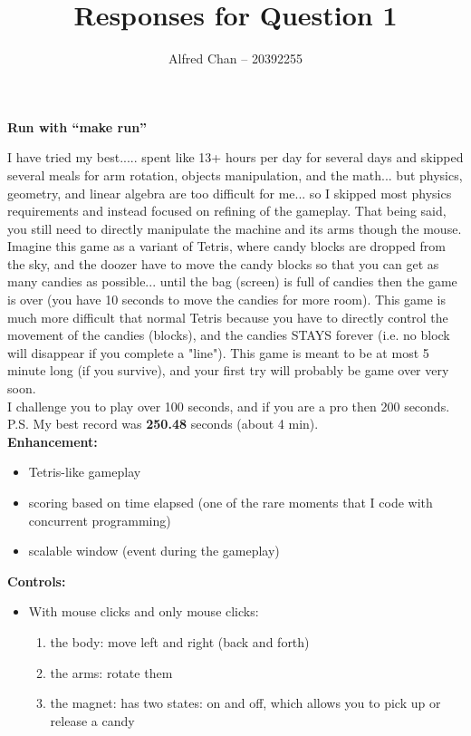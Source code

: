 \documentclass[12pt]{article}
\title{Responses for Question 1}
\author{Alfred Chan -- 20392255}
\begin{document}
\maketitle

{
\bf
Run with ``make run''
}

I have tried my best..... spent like 13+ hours per day for several days and skipped several meals for arm rotation, objects manipulation, and the math... but physics, geometry, and linear algebra are too difficult for me... so I skipped most physics requirements and instead focused on refining of the gameplay. That being said, you still need to directly manipulate the machine and its arms though the mouse.\\

Imagine this game as a variant of Tetris, where candy blocks are dropped from the sky, and the doozer have to move the candy blocks so that you can get as many candies as possible... until the bag (screen) is full of candies then the game is over (you have 10 seconds to move the candies for more room). This game is much more difficult that normal Tetris because you have to directly control the movement of the candies (blocks), and the candies STAYS forever (i.e. no block will disappear if you complete a "line"). This game is meant to be at most 5 minute long (if you survive), and your first try will probably be game over very soon.\\

I challenge you to play over 100 seconds, and if you are a pro then 200 seconds.
P.S. My best record was {\bf 250.48} seconds (about 4 min).\\

{\bf Enhancement:}
\begin{itemize}
	\item Tetris-like gameplay
	\item scoring based on time elapsed (one of the rare moments that I code with concurrent programming)
	\item scalable window (event during the gameplay)
\end{itemize}

{\bf Controls:}
\begin{itemize}
	\item With mouse clicks and only mouse clicks:
	\begin{enumerate}
	\item the body: move left and right (back and forth)
	\item the arms: rotate them
	\item the magnet: has two states: on and off, which allows you to pick up or release a candy
	\end{enumerate}
\end{itemize}
\end{document}
